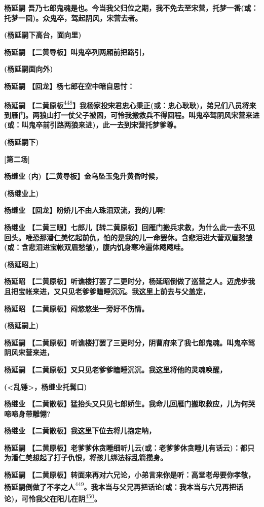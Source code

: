 \textbf{杨延嗣
吾乃七郎鬼魂是也。今当我父归位之期，我不免去至宋营，托梦一番(或：托梦一回)。众鬼卒，驾起阴风，宋营去者。}

\textbf{(杨延嗣下高台，面向里)}

\textbf{杨延嗣 【二黄导板】叫鬼卒列两厢前把路引，}

\textbf{(杨延嗣面向外)}

\textbf{杨延嗣 【回龙】杨七郎在空中暗自思忖：}

\textbf{杨延嗣
【二黄原板}\protect\hyperlink{fn448}{\textsuperscript{448}}\textbf{】我杨家投宋君忠心秉正(或：忠心耿耿)，弟兄们八员将来到雁门。两狼山打一仗父子被困，可怜我搬救兵不得回程。叫鬼卒驾阴风宋营来进(或：叫鬼卒前引路两狼来进)，此一去到宋营托梦爹尊。}

\textbf{(杨延嗣下)}

\textbf{{[}第二场{]}}

\textbf{杨继业 (内)【二黄导板】金乌坠玉兔升黄昏时候，}

\textbf{(杨继业上)}

\textbf{杨继业 【回龙】盼娇儿不由人珠泪双流，我的儿啊!}

\textbf{杨继业
【二黄三眼】七郎儿【转二黄原板】回雁门搬兵求救，为什么此一去不见回头。唯恐那潘仁美忆起前仇，怕的是我的儿一命罢休。含悲泪进大营双眉愁皱(或：含悲泪进宝帐双眉愁皱)，腹内饥身寒冷遍体飕飕哇。}

\textbf{(杨延昭上)}

\textbf{杨延昭
【二黄原板】听谯楼打罢了二更时分，杨延昭倒做了巡营之人。迈虎步我且把宝帐来进，又只见老爹爹瞌睡沉沉。我这里上前去与父盖定，}

\textbf{杨延昭 【二黄原板】闷悠悠坐一旁好不伤情。}

\textbf{(杨延嗣上)}

\textbf{杨延嗣
【二黄原板】听谯楼打罢了三更时分，阴曹府来了我七郎鬼魂。叫鬼卒驾阴风宋营来进，}

\textbf{杨延嗣 【二黄原板】又只见老爹爹瞌睡沉沉。我这里将他的灵魂唤醒，}

\textbf{(\textless{}乱锤\textgreater{}，杨继业托髯口)}

\textbf{杨继业
【二黄散板】猛抬头又只见七郎娇生。我命儿回雁门搬取救应，儿为何哭啼啼身带雕翎?}

\textbf{杨继业 【二黄散板】我这里下位去将儿抱定呐，}

\textbf{杨延嗣
【二黄原板】老爹爹休贪睡细听儿云(或：老爹爹休贪睡儿有话云)：都只为潘仁美想起了打子仇恨，将孩儿绑法标乱箭攒身。}

\textbf{杨延嗣
【二黄原板】转面来再对六兄论，小弟言来你是听：高堂老母要你孝敬，杨延嗣倒做了不孝之人}\protect\hyperlink{fn449}{\textsuperscript{449}}\textbf{。我本当与父兄再把话论(或：我本当与六兄再把话论)，可怜我父在阳儿在阴}\protect\hyperlink{fn450}{\textsuperscript{450}}\textbf{。}

